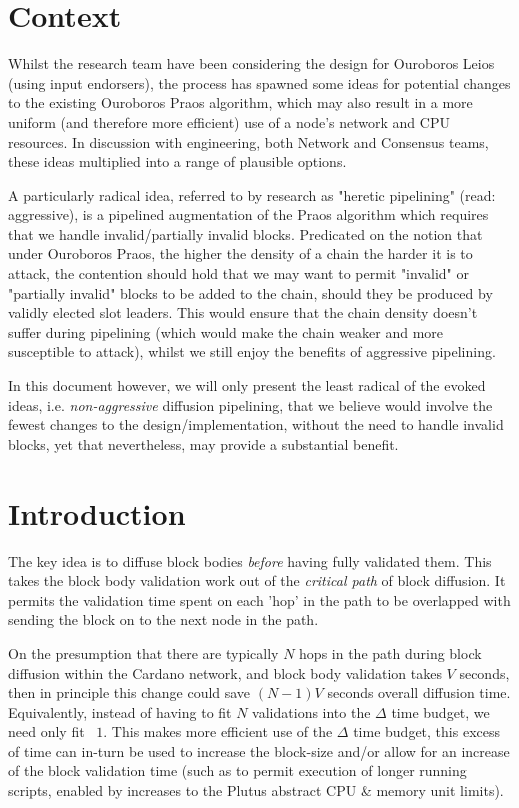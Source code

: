 \documentclass[11pt,a4paper]{article}
\begin{document}
\section{Context}
Whilst the research team have been considering the design for Ouroboros Leios
(using input endorsers), the process has spawned some ideas for potential changes to
the existing Ouroboros Praos algorithm, which may also result in a more uniform (and therefore
more efficient) use of a node's network and CPU resources. In discussion with engineering, both 
Network and Consensus teams, these ideas multiplied into a range of plausible options.

A particularly radical idea, referred to by research as "heretic pipelining" (read: aggressive), is 
a pipelined augmentation of the Praos algorithm which requires that we handle invalid/partially invalid blocks.
Predicated on the notion that under Ouroboros Praos, the higher the density of a chain the 
harder it is to attack, the contention should hold that we may want to permit "invalid" or "partially 
invalid" blocks to be added to the chain, should they be produced by validly elected slot leaders.
This would ensure that the chain density doesn't suffer during pipelining (which would make the chain 
weaker and more susceptible to attack), whilst we still enjoy the benefits of aggressive pipelining.

In this document however, we will only present the least radical of the evoked ideas, 
i.e. \emph{non-aggressive} diffusion pipelining, that we believe would involve the fewest changes to the 
design/implementation, without the need to handle invalid blocks, yet that nevertheless, may provide a substantial benefit.

\section{Introduction}
The key idea is to diffuse block bodies \emph{before} having fully validated
them. This takes the block body validation work out of the \emph{critical path} of
block diffusion. It permits the validation time spent on each 'hop' in the path to be
overlapped with sending the block on to the next node in the path.

On the presumption that there are typically $N$ hops in the path during block diffusion
within the Cardano network, and block body validation takes $V$ seconds, then in
principle this change could save $(N-1) V$ seconds overall diffusion time. Equivalently, 
instead of having to fit $N$ validations into the $\Delta$ time budget, we need 
only fit ~$1$. This makes more efficient use of the $\Delta$ time budget, this excess 
of time can in-turn be used to increase the block-size and/or allow for an increase of 
the block validation time (such as to permit execution of longer running scripts,
enabled by increases to the Plutus abstract CPU \& memory unit limits).
\end{document}
